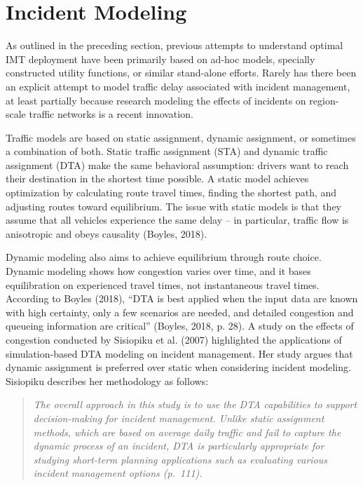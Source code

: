 \documentclass[fancy, oneside, mastersfancy, ms]{byuthesis}
\begin{document}
\hypertarget{incident-modeling}{%
\section{Incident Modeling}\label{incident-modeling}}

As outlined in the preceding section, previous attempts to understand
optimal IMT deployment have been primarily based on ad-hoc models,
specially constructed utility functions, or similar stand-alone efforts.
Rarely has there been an explicit attempt to model traffic delay
associated with incident management, at least partially because research
modeling the effects of incidents on region-scale traffic networks is a
recent innovation.

Traffic models are based on static assignment, dynamic assignment, or
sometimes a combination of both. Static traffic assignment (STA) and
dynamic traffic assignment (DTA) make the same behavioral assumption:
drivers want to reach their destination in the shortest time possible. A
static model achieves optimization by calculating route travel times,
finding the shortest path, and adjusting routes toward equilibrium. The
issue with static models is that they assume that all vehicles
experience the same delay -- in particular, traffic flow is anisotropic
and obeys causality (Boyles, 2018).

Dynamic modeling also aims to achieve equilibrium through route choice.
Dynamic modeling shows how congestion varies over time, and it bases
equilibration on experienced travel times, not instantaneous travel
times. According to Boyles (2018), ``DTA is best applied when the input
data are known with high certainty, only a few scenarios are needed, and
detailed congestion and queueing information are critical'' (Boyles,
2018, p. 28). A study on the effects of congestion conducted by
Sisiopiku et al. (2007) highlighted the applications of simulation-based
DTA modeling on incident management. Her study argues that dynamic
assignment is preferred over static when considering incident modeling.
Sisiopiku describes her methodology as follows:

\begin{quote}
\emph{The overall approach in this study is to use the DTA capabilities
to support decision-making for incident management. Unlike static
assignment methods, which are based on average daily traffic and fail to
capture the dynamic process of an incident, DTA is particularly
appropriate for studying short-term planning applications such as
evaluating various incident management options (p.~111).}
\end{quote}
\end{document}
